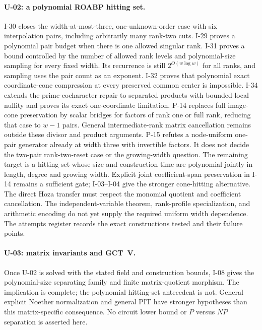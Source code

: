 \paragraph{U-02: a polynomial ROABP hitting set.}
I-30 closes the width-at-most-three, one-unknown-order case with six interpolation pairs, including arbitrarily many rank-two cuts. I-29 proves a polynomial pair budget when there is one allowed singular rank. I-31 proves a bound controlled by the number of allowed rank levels and polynomial-size sampling for every fixed width. Its recurrence is still $2^{O(w\log w)}$ for all ranks, and sampling uses the pair count as an exponent. I-32 proves that polynomial exact coordinate-cone compression at every preserved common center is impossible. I-34 extends the prime-cocharacter repair to separated products with bounded local nullity and proves its exact one-coordinate limitation. P-14 replaces full image-cone preservation by scalar bridges for factors of rank one or full rank, reducing that case to $w-1$ pairs. General intermediate-rank matrix cancellation remains outside these divisor and product arguments. P-15 refutes a node-uniform one-pair generator already at width three with invertible factors. It does not decide the two-pair rank-two-reset case or the growing-width question. The remaining target is a hitting set whose size and construction time are polynomial jointly in length, degree and growing width. Explicit joint coefficient-span preservation in I-14 remains a sufficient gate; I-03--I-04 give the stronger cone-hitting alternative. The direct Hoza transfer must respect the monomial quotient and coefficient cancellation. The independent-variable theorem, rank-profile specialization, and arithmetic encoding do not yet supply the required uniform width dependence. The attempts register records the exact constructions tested and their failure points.

\paragraph{U-03: matrix invariants and GCT~V.}
Once U-02 is solved with the stated field and construction bounds, I-08 gives the polynomial-size separating family and finite matrix-quotient morphism. The implication is complete; the polynomial hitting-set antecedent is not. General explicit Noether normalization and general PIT have stronger hypotheses than this matrix-specific consequence. No circuit lower bound or $P$ versus $NP$ separation is asserted here.

